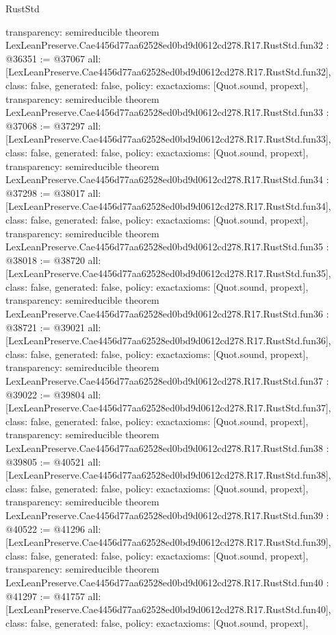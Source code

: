 \begin{lexlean}{RustStd}
\begin{coremodule}
{  transparency: semireducible
}
theorem LexLeanPreserve.Cae4456d77aa62528ed0bd9d0612cd278.R17.RustStd.fun32 : @36351 := @37067 {
  all: [LexLeanPreserve.Cae4456d77aa62528ed0bd9d0612cd278.R17.RustStd.fun32],
  class: false,
  generated: false,
  policy: exact{axioms: [Quot.sound, propext]},
  transparency: semireducible
}
theorem LexLeanPreserve.Cae4456d77aa62528ed0bd9d0612cd278.R17.RustStd.fun33 : @37068 := @37297 {
  all: [LexLeanPreserve.Cae4456d77aa62528ed0bd9d0612cd278.R17.RustStd.fun33],
  class: false,
  generated: false,
  policy: exact{axioms: [Quot.sound, propext]},
  transparency: semireducible
}
theorem LexLeanPreserve.Cae4456d77aa62528ed0bd9d0612cd278.R17.RustStd.fun34 : @37298 := @38017 {
  all: [LexLeanPreserve.Cae4456d77aa62528ed0bd9d0612cd278.R17.RustStd.fun34],
  class: false,
  generated: false,
  policy: exact{axioms: [Quot.sound, propext]},
  transparency: semireducible
}
theorem LexLeanPreserve.Cae4456d77aa62528ed0bd9d0612cd278.R17.RustStd.fun35 : @38018 := @38720 {
  all: [LexLeanPreserve.Cae4456d77aa62528ed0bd9d0612cd278.R17.RustStd.fun35],
  class: false,
  generated: false,
  policy: exact{axioms: [Quot.sound, propext]},
  transparency: semireducible
}
theorem LexLeanPreserve.Cae4456d77aa62528ed0bd9d0612cd278.R17.RustStd.fun36 : @38721 := @39021 {
  all: [LexLeanPreserve.Cae4456d77aa62528ed0bd9d0612cd278.R17.RustStd.fun36],
  class: false,
  generated: false,
  policy: exact{axioms: [Quot.sound, propext]},
  transparency: semireducible
}
theorem LexLeanPreserve.Cae4456d77aa62528ed0bd9d0612cd278.R17.RustStd.fun37 : @39022 := @39804 {
  all: [LexLeanPreserve.Cae4456d77aa62528ed0bd9d0612cd278.R17.RustStd.fun37],
  class: false,
  generated: false,
  policy: exact{axioms: [Quot.sound, propext]},
  transparency: semireducible
}
theorem LexLeanPreserve.Cae4456d77aa62528ed0bd9d0612cd278.R17.RustStd.fun38 : @39805 := @40521 {
  all: [LexLeanPreserve.Cae4456d77aa62528ed0bd9d0612cd278.R17.RustStd.fun38],
  class: false,
  generated: false,
  policy: exact{axioms: [Quot.sound, propext]},
  transparency: semireducible
}
theorem LexLeanPreserve.Cae4456d77aa62528ed0bd9d0612cd278.R17.RustStd.fun39 : @40522 := @41296 {
  all: [LexLeanPreserve.Cae4456d77aa62528ed0bd9d0612cd278.R17.RustStd.fun39],
  class: false,
  generated: false,
  policy: exact{axioms: [Quot.sound, propext]},
  transparency: semireducible
}
theorem LexLeanPreserve.Cae4456d77aa62528ed0bd9d0612cd278.R17.RustStd.fun40 : @41297 := @41757 {
  all: [LexLeanPreserve.Cae4456d77aa62528ed0bd9d0612cd278.R17.RustStd.fun40],
  class: false,
  generated: false,
  policy: exact{axioms: [Quot.sound, propext]},
}
\end{coremodule}
\end{lexlean}
